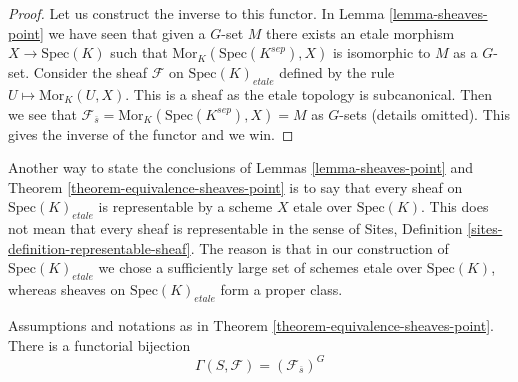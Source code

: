 \begin{proof}
Let us construct the inverse to this functor. In
Lemma \ref{lemma-sheaves-point}
we have seen that given a $G$-set $M$ there exists an etale morphism
$X \to \text{Spec}(K)$
such that $\text{Mor}_K(\text{Spec}(K^{sep}), X)$ is
isomorphic to $M$ as a $G$-set. Consider the sheaf
$\mathcal{F}$ on $\text{Spec}(K)_{etale}$ defined by
the rule $U \mapsto \text{Mor}_K(U, X)$. This is a sheaf as the etale
topology is subcanonical. Then we see that
$\mathcal{F}_{\overline{s}} = \text{Mor}_K(\text{Spec}(K^{sep}), X) = M$
as $G$-sets (details omitted). This gives the inverse of the functor and
we win.
\end{proof}

\begin{remark}
\label{remark-every-sheaf-representable}
Another way to state the conclusions of
Lemmas \ref{lemma-sheaves-point} and
Theorem \ref{theorem-equivalence-sheaves-point}
is to say that every sheaf on $\text{Spec}(K)_{etale}$ is representable
by a scheme $X$ etale over $\text{Spec}(K)$.
This does not mean that every sheaf is representable in the sense of
Sites, Definition \ref{sites-definition-representable-sheaf}.
The reason is that in our construction of $\text{Spec}(K)_{etale}$ we chose
a sufficiently large set of schemes etale over $\text{Spec}(K)$, whereas
sheaves on $\text{Spec}(K)_{etale}$ form a proper class.
\end{remark}

\begin{lemma}
\label{lemma-global-sections-point}
Assumptions and notations as in
Theorem \ref{theorem-equivalence-sheaves-point}.
There is a functorial bijection
$$
\Gamma(S, \mathcal{F}) = (\mathcal{F}_{\overline{s}})^G
$$
\end{lemma}

